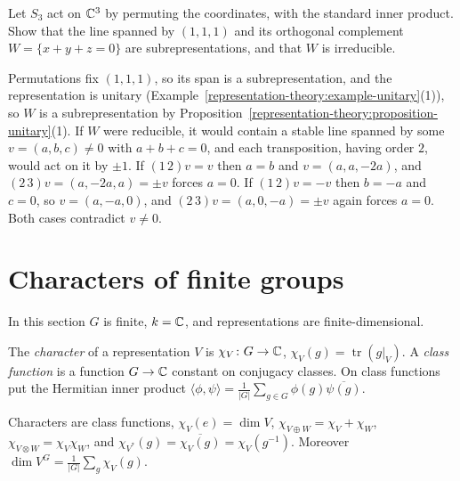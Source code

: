 \begin{exercise}\label{representation-theory:exercise-unitary-s3}
Let $S_3$ act on $\mathbb{C}^3$ by permuting the coordinates, with the standard inner product. Show that the line spanned by $(1, 1, 1)$ and its orthogonal complement
$W = \{x + y + z = 0\}$ are subrepresentations, and that $W$ is irreducible.
\end{exercise}

\begin{solution}
Permutations fix $(1, 1, 1)$, so its span is a subrepresentation, and the representation is unitary (Example~\ref{representation-theory:example-unitary}(1)), so $W$ is a subrepresentation by
Proposition~\ref{representation-theory:proposition-unitary}(1). If $W$ were reducible, it would contain a stable line spanned by some $v = (a, b, c) \neq 0$ with $a + b + c = 0$, and each
transposition, having order $2$, would act on it by $\pm1$. If $(1\,2)v = v$ then $a = b$ and $v = (a, a, -2a)$, and $(2\,3)v = (a, -2a, a) = \pm v$ forces $a = 0$. If $(1\,2)v = -v$ then
$b = -a$ and $c = 0$, so $v = (a, -a, 0)$, and $(2\,3)v = (a, 0, -a) = \pm v$ again forces $a = 0$. Both cases contradict $v \neq 0$.
\end{solution}

\section{Characters of finite groups}\label{representation-theory:section-characters}

In this section $G$ is finite, $k = \mathbb{C}$, and representations are finite-dimensional.

\begin{definition}\label{representation-theory:definition-character}
The \emph{character} of a representation $V$ is $\chi_V \colon G \to \mathbb{C}$, $\chi_V(g) = \operatorname{tr}(g|_V)$. A
\emph{class function} is a function $G \to \mathbb{C}$ constant on conjugacy classes. On class functions put the
Hermitian inner product $\langle \phi, \psi \rangle = \frac{1}{|G|}\sum_{g \in G}\phi(g)\overline{\psi(g)}$.
\end{definition}

\begin{proposition}\label{representation-theory:proposition-character-properties}
Characters are class functions, $\chi_V(e) = \dim V$, $\chi_{V \oplus W} = \chi_V + \chi_W$,
$\chi_{V \otimes W} = \chi_V\chi_W$, and $\chi_{V^*}(g) = \overline{\chi_V(g)} = \chi_V(g^{-1})$. Moreover
$\dim V^G = \frac{1}{|G|}\sum_g \chi_V(g)$.
\end{proposition}


